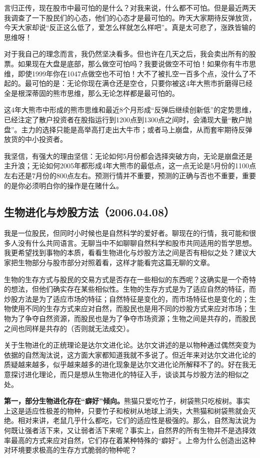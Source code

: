 言归正传，现在股市中最可怕的是什么？对我来说，什么都不可怕。但是最近两天我调查了一下股民们的心态，他们的心态才是最可怕的。昨天大家期待反弹放货，今天大家却说“反正这么低了，爱怎么样就怎么样吧”。真是太可悲了，涨跌皆输的思维呀！

对于我自己的理念而言，我仍然坚决看多。但也许在几天之后，我会卖出所有的股票。如果现在大盘是底部，那么做空可怕吗？我要说做空不可怕！如果你有牛市思维，即使1999年你在1047点做空也不可怕！大不了被扎空一百多个点，没什么了不起的。最可怕的是：无论你现在满仓还是空仓，只要你被这4年大熊市折磨得已经全是根深蒂固的熊市思维，那么无论怎样都是最可怕的。

这4年大熊市中形成的熊市思维和最近8个月形成“反弹后继续创新低”的定势思维，已经注定了散户投资者在股指运行到1200点到1300点之间时，会涌现大量“散户抛盘”。主力的选择只能是高举高打走出大牛市；或者马上崩盘，从而套牢期待反弹放货的中小投资者。

我坚信，有强大的理由坚信：无论如何5月份都会选择突破方向，无论是崩盘还是主升浪；无论如何2005年都形成4年大熊市的最低点，这一点无论是5月份的1100点左右还是7月份的800点左右。预测行情并不重要，预测的正确与否也不重要，重要的是你必须明白你的操作是在赌什么。

\subsection{生物进化与炒股方法（2006.04.08）}

我是一位股民，但同时小时候也是自然科学的爱好者。聊现在的行情，我可能和很多人没有什么共同语言。无聊当中不如聊聊自然科学和股市共同适用的哲学思想。我更希望找到事物的本质，看看生物进化与炒股方法之间是否有相似之处？建议大家把生物部分与股市部分对照着看，这样才能看完这篇无聊的文章。

生物的生存方式与股民的交易方式是否存在一些相似的东西呢？这确实是一个奇特的想法，但他们确实存在某些相似性。生物的生存方式是为了适应自然的特征，而炒股方法是为了适应市场的特征；自然特征是变化的，而市场特征也是变化的；生物使用不同的生存方式来应对自然，而股民也是用不同的炒股方式来应对市场；生物为了争夺自然资源，而股民也是为了争夺市场资源；生物之间是共存的，而股民之间也同样是共存的（否则就无法成交）。

关于生物进化的正统理论是达尔文进化论。达尔文讲述的是以物种通过偶然突变为依据的自然淘汰说，这方面大家都知道我就不多说了。但近年来对达尔文进化论的质疑越来越多，似乎越来越多的进化现象是达尔文进化论所解释不了的。好在我无意探讨进化理论，而只是想从生物进化的特征入手，谈谈其与炒股方法的相似之处。

\textbf{第一，部分生物进化存在“癖好”倾向。}熊猫只爱吃竹子，树袋熊只吃桉树。事实上这是适应性极差的物种，只要竹子和桉树从地球上消失，大熊猫和树袋熊就会灭绝。相对来讲，老鼠几乎什么都吃，它们的适应性是极强的。那么，自然淘汰说为何既让强者活下来，又让弱者活下来呢？事实上，自然界的所有生物并不是选择效率最高的方式来应对自然，它们存在着某种特殊的“癖好”。上帝为什么创造出这种对环境要求极高的生存方式脆弱的物种呢？

